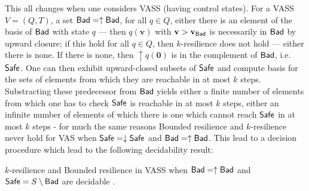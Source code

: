 This all changes when one considers VASS (having control states). For a VASS $V = (Q,T)$, a set $\textsf{Bad} = \uparrow \textsf{Bad}$, for all $q \in Q$, either there is an element of the basis of $\textsf{Bad}$ with state $q$ \----
then $q(\textbf{v})$ with $\textbf{v} > \textbf{v}_{\textsf{Bad}}$ is necessarily in $\textsf{Bad}$ by upward closure; if this hold for all $q \in Q$, then $k$-resilience does not hold \---- either there is none. If there is none, then 
$\uparrow q(\textbf{0})$
 is in the complement of $\textsf{Bad}$, i.e. $\textsf{Safe}$. One can then exhibit upward-closed subsets of 
 $\textsf{Safe}$ and compute basis for the sets of elements from which they are reachable in at most $k$ steps. 
Substracting these predecessor from $\textsf{Bad}$ yields either a finite number of elements from which one has to check $\textsf{Safe}$ is reachable in at most $k$ steps, either an infinite number of elements of which there is one which cannot reach $\textsf{Safe}$ in at most $k$ steps \-- for much the same reasons {\sc Bounded resilience} and {\sc $k$-resilience} never hold for VAS when $\textsf{Safe} = \downarrow \textsf{Safe}$ and $\textsf{Bad} = \uparrow \textsf{Bad}$. This lead to a decision procedure%
 which lead to the following decidability result:

\begin{theorem}
{\sc $k$-resilience }  and {\sc Bounded resilience} in VASS when $\textsf{Bad} = \uparrow \textsf{Bad}$ and $\textsf{Safe} = S \setminus \textsf{Bad}$ are decidable%
.
\end{theorem}

